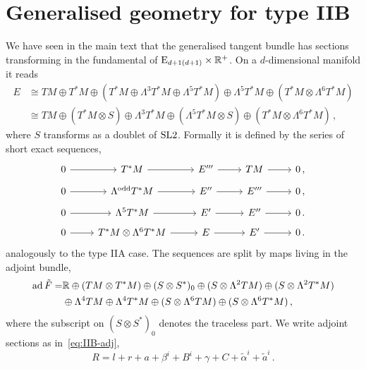 \documentclass[debug]{phd}
\begin{document}
		\section{Generalised geometry for type IIB}\label{appsec:EGGIIB}
			We have seen in the main text that the generalised tangent bundle has sections transforming in the fundamental of $\mathrm{E}_{d+1(d+1)} \times \mathbb{R}^+$.
			On a $d$-dimensional manifold it reads
					\begin{equation*}
						\begin{split}
							E 	& \cong TM\oplus T^{*}M\oplus(T^{*}M\oplus\Lambda^{3}T^{*}M\oplus\Lambda^{5}T^{*}M)\oplus\Lambda^{5}T^{*}M\oplus(T^{*}M\otimes\Lambda^{6}T^{*}M)\\
 								& \cong TM\oplus(T^{*}M\otimes S)\oplus\Lambda^{3}T^{*}M\oplus(\Lambda^{5}T^{*}M\otimes S)\oplus(T^{*}M\otimes\Lambda^{6}T^{*}M)\, ,
						\end{split}
					\end{equation*}
			where $S$ transforms as a doublet of $\mathrm{SL}{2}$.
			Formally it is defined by the series of short exact sequences,
					\begin{equation}\label{extIIB}
						\begin{tikzcd}[row sep=tiny]
							0 \arrow{r} & T^*M \arrow{r} & E''' \arrow{r} &TM \arrow{r} &0 	\, , \\
							0 \arrow{r} &\Lambda^{\mathrm{odd}} T^*M \arrow{r} &E'' \arrow{r} &E''' \arrow{r} &0 	\, , \\
							0 \arrow{r} &\Lambda^5 T^*M \arrow{r} &E' \arrow{r} &E'' \arrow{r} &0 \, . \\
							0 \arrow{r} &T^*M \otimes \Lambda^6 T^*M \arrow{r} &E \arrow{r} &E' \arrow{r} &0 \, .
						\end{tikzcd}
					\end{equation}
			analogously to the type IIA case.
			The sequences are split by maps living in the adjoint bundle,
					\begin{equation}
						\begin{split}
							\operatorname{ad} \tilde{F} = & \mathbb{R} \oplus(TM\otimes T^{*}M) \oplus(S\otimes S^{*})_0 \oplus(S\otimes\Lambda^{2}TM) \oplus(S\otimes\Lambda^{2}T^{*}M) \\
										& \oplus\Lambda^{4}TM\oplus\Lambda^{4}T^{*}M \oplus(S \otimes\Lambda^{6}TM)\oplus(S\otimes\Lambda^{6}T^{*}M) \, ,
						\end{split}
					\end{equation}
			where the subscript on $(S\otimes S^*)_0$ denotes the traceless part. 
			We write adjoint sections as in~\eqref{eq:IIB-adj},
					\begin{equation}
						R=l+r+a+\beta^{i}+B^{i}+\gamma+C+\tilde{\alpha}^{i}+\tilde{a}^{i} \, .
					\end{equation}
				
\end{document}

